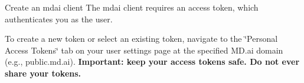 Create an {\ttfamily mdai} client The mdai client requires an access token, which authenticates you as the user.

To create a new token or select an existing token, navigate to the \char`\"{}\+Personal Access Tokens\char`\"{} tab on your user settings page at the specified MD.\+ai domain (e.\+g., public.\+md.\+ai). {\bfseries{Important\+: keep your access tokens safe. Do not ever share your tokens.}} 